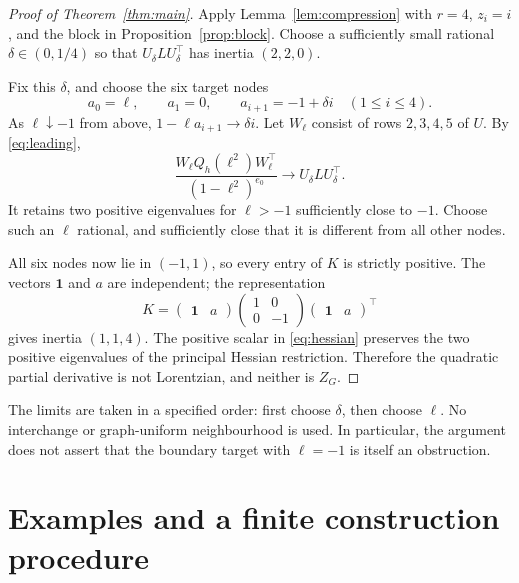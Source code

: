 \documentclass[11pt]{article}
\theoremstyle{remark}\newtheorem{remark}[theorem]{Remark}
\newcommand{\one}{\mathbf 1}
\begin{document}
\begin{proof}[Proof of Theorem~\ref{thm:main}]
Apply Lemma~\ref{lem:compression} with $r=4$,
$z_i=i$, and the block in Proposition~\ref{prop:block}.
Choose a sufficiently small rational $\delta\in(0,1/4)$ so that
$U_\delta L U_\delta^\top$ has inertia $(2,2,0)$.

Fix this $\delta$, and choose the six target nodes
\begin{equation}
 a_0=\ell,\qquad a_1=0,\qquad
 a_{i+1}=-1+\delta i\quad(1\le i\le4).           \label{eq:nodes}
\end{equation}
As $\ell\downarrow-1$ from above,
$1-\ell a_{i+1}\to\delta i$.
Let $W_\ell$ consist of rows $2,3,4,5$ of $U$.
By \eqref{eq:leading},
\[
 \frac{W_\ell Q_h(\ell^2)W_\ell^\top}{(1-\ell^2)^{e_0}}
 \longrightarrow U_\delta L U_\delta^\top.
\]
It retains two positive eigenvalues for $\ell>-1$ sufficiently
close to $-1$. Choose such an $\ell$ rational, and sufficiently
close that it is different from all other nodes.

All six nodes now lie in $(-1,1)$, so every entry of $K$ is
strictly positive. The vectors $\one$ and $a$ are independent;
the representation
\[
 K=\begin{pmatrix}\one&a\end{pmatrix}
       \begin{pmatrix}1&0\\0&-1\end{pmatrix}
       \begin{pmatrix}\one&a\end{pmatrix}^{\!\top}
\]
gives inertia $(1,1,4)$.
The positive scalar in \eqref{eq:hessian} preserves the two
positive eigenvalues of the principal Hessian restriction.
Therefore the quadratic partial derivative is not Lorentzian,
and neither is $Z_G$.
\end{proof}

The limits are taken in a specified order: first choose $\delta$,
then choose $\ell$. No interchange or graph-uniform neighbourhood
is used. In particular, the argument does not assert that the
boundary target with $\ell=-1$ is itself an obstruction.

\section{Examples and a finite construction procedure}
\end{document}

